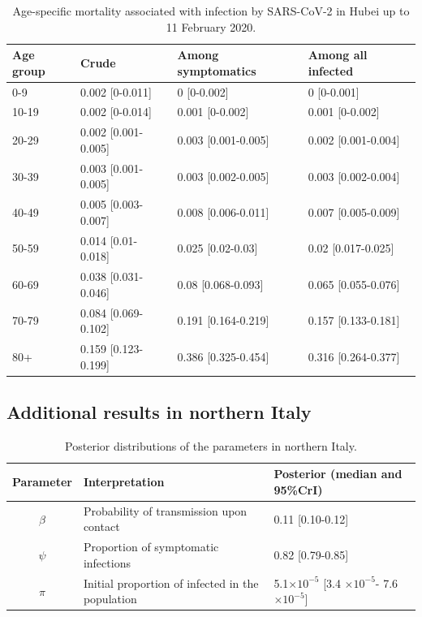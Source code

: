 \documentclass{article}
\begin{document}
\begin{table}[H]
	\caption{Age-specific mortality associated with infection by SARS-CoV-2 in Hubei up to 11 February 2020.}
	\centering
	\begin{tabular}{llll}
		\hline
		Age group & Crude & Among symptomatics & Among all infected \\ 
		\hline
		0-9 & 0.002 [0-0.011] & 0 [0-0.002] & 0 [0-0.001] \\ 
		10-19 & 0.002 [0-0.014] & 0.001 [0-0.002] & 0.001 [0-0.002] \\ 
		20-29 & 0.002 [0.001-0.005] & 0.003 [0.001-0.005] & 0.002 [0.001-0.004] \\ 
		30-39 & 0.003 [0.001-0.005] & 0.003 [0.002-0.005] & 0.003 [0.002-0.004] \\ 
		40-49 & 0.005 [0.003-0.007] & 0.008 [0.006-0.011] & 0.007 [0.005-0.009] \\ 
		50-59 & 0.014 [0.01-0.018] & 0.025 [0.02-0.03] & 0.02 [0.017-0.025] \\ 
		60-69 & 0.038 [0.031-0.046] & 0.08 [0.068-0.093] & 0.065 [0.055-0.076] \\ 
		70-79 & 0.084 [0.069-0.102] & 0.191 [0.164-0.219] & 0.157 [0.133-0.181] \\ 
		80+ & 0.159 [0.123-0.199] & 0.386 [0.325-0.454] & 0.316 [0.264-0.377] \\ 
		\hline
	\end{tabular}
\end{table}



\subsection{Additional results in northern Italy}


\begin{table}[H]
	\caption{Posterior distributions of the parameters in northern Italy.}
	\centering
	\begin{tabular}{cll}
		\hline
		Parameter& Interpretation & Posterior (median and 95\%CrI) \\ 
		\hline
		$\beta$ & Probability of transmission upon contact & 0.11 [0.10-0.12] \\ 
		$\psi$ & Proportion of symptomatic infections &0.82 [0.79-0.85] \\ 
		$\pi$ & Initial proportion of infected in the population &  5.1$\times 10^{-5}$ [3.4 $\times 10^{-5}$- 7.6$\times 10^{-5}$] \\ 
		\hline
	\end{tabular}
\end{table}
\end{document}
